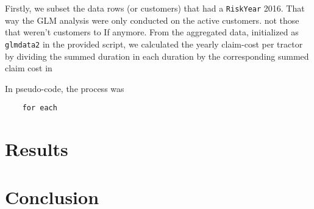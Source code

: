 \documentclass[11pt]{article}
\begin{document}
Firstly, we subset the data rows (or customers) that had a \texttt{RiskYear} 2016. That 
way the GLM analysis were only conducted on the active customers. not those that weren't
customers to If anymore. From the aggregated data, initialized as \texttt{glmdata2} in the
provided script, we calculated the yearly claim-cost per tractor by dividing the summed duration
in each duration by the corresponding summed claim cost in


In pseudo-code, the process was 

\begin{verbatim}
    for each 
\end{verbatim}
\section{Results}
\label{sec:org898dae6}
\section{Conclusion}
\label{sec:org13e31d1}
\end{document}
